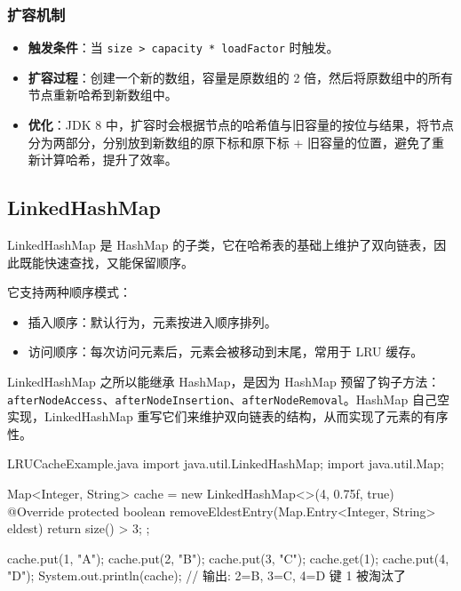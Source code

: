\subsubsection{扩容机制}
\begin{itemize}
    \item \textbf{触发条件}：当 \texttt{size > capacity * loadFactor} 时触发。
    \item \textbf{扩容过程}：创建一个新的数组，容量是原数组的 2 倍，然后将原数组中的所有节点重新哈希到新数组中。
    \item \textbf{优化}：JDK 8 中，扩容时会根据节点的哈希值与旧容量的按位与结果，将节点分为两部分，分别放到新数组的原下标和原下标 + 旧容量的位置，避免了重新计算哈希，提升了效率。
\end{itemize}


\subsection{LinkedHashMap}
LinkedHashMap 是 HashMap 的子类，它在哈希表的基础上维护了双向链表，因此既能快速查找，又能保留顺序。

它支持两种顺序模式：

\begin{itemize}
    \item 插入顺序：默认行为，元素按进入顺序排列。
    \item 访问顺序：每次访问元素后，元素会被移动到末尾，常用于 LRU 缓存。
\end{itemize}

LinkedHashMap 之所以能继承 HashMap，是因为 HashMap 预留了钩子方法：\texttt{afterNodeAccess}、\texttt{afterNodeInsertion}、\texttt{afterNodeRemoval}。HashMap 自己空实现，LinkedHashMap 重写它们来维护双向链表的结构，从而实现了元素的有序性。

\begin{codeblock}[Java]{LRUCacheExample.java}
import java.util.LinkedHashMap;
import java.util.Map;

Map<Integer, String> cache = new LinkedHashMap<>(4, 0.75f, true) {
    @Override
    protected boolean removeEldestEntry(Map.Entry<Integer, String> eldest) {
        return size() > 3;
    }
};

cache.put(1, "A");
cache.put(2, "B");
cache.put(3, "C");
cache.get(1);
cache.put(4, "D");
System.out.println(cache);
// 输出: {2=B, 3=C, 4=D} 键 1 被淘汰了
\end{codeblock}

